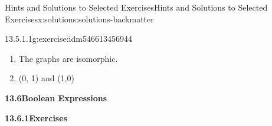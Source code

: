 \documentclass[oneside,10pt,]{book}
\newcommand{\blocktitlefont}{\relax}
\numberwithin{equation}{section}
\begin{document}
\begin{solutions-chapter}{Hints and Solutions to Selected Exercises}{}{Hints and Solutions to Selected Exercises}{}{}{x:solutions:solutions-backmatter}
\begin{divisionsolution}{13.5.1.1}{}{g:exercise:idm546613456944}
\begin{enumerate}[label=(\alph*)]
\begin{equation*}
\begin{array}{lc}
\begin{array}{c|cccc}
\end{array}
&\\
\begin{array}{c|cccc}
\land & (0,0) & (0,1) & (1,0) & (1,1) \\
\hline
(0,0) &(0,0) & (0,0) & (0,0) & (0,0) \\
(0,1) &(0,0) & (0,1) & (0,0) & (0,1) \\
(1,0) &(0,0) & (0,0) & (1,0) & (1,0) \\
(1,1) &(0,0) & (0,1) & (1,0) & (1,1) \\
\end{array}
&
\begin{array}{c|c}
u & \overset{\pmb{\_}}{u} \\
\hline
(0,0) & (1,1) \\
(0,1) &(1,0) \\
(1,0) &(0,1) \\
(1,1) &(0,0) \\
\end{array}
\\
\end{array}
\end{equation*}
%
\item{}The graphs are isomorphic.%
\item{}(0, 1) and (1,0)%
\end{enumerate}
%
\end{divisionsolution}%
%
\par\smallskip
\noindent\textbf{\Large{}13.6\space\textperiodcentered\space{}Boolean Expressions}
\par\smallskip
\par\smallskip
\noindent\textbf{\Large{}13.6.1\space\textperiodcentered\space{}Exercises}
\par\smallskip
{}
\end{solutions-chapter}
\end{document}

